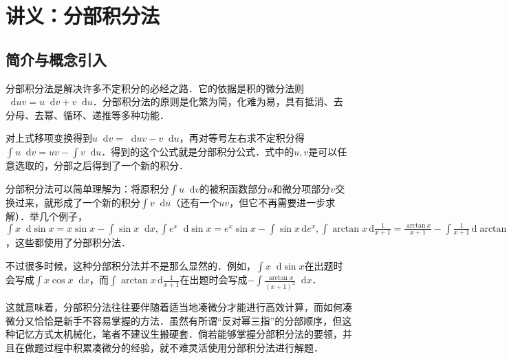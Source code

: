 \documentclass{ctexbook}
\newcommand*{\dif}{\mathop{}\!\mathrm{d}}
\begin{document}
\chapter{讲义：分部积分法}
\section{简介与概念引入}
分部积分法是解决许多不定积分的必经之路．它的依据是积的微分法则$\dif{u}v=u\dif{v}+v\dif{u}$．分部积分法的原则是化繁为简，化难为易，具有抵消、去分母、去幂、循环、递推等多种功能．\par
对上式移项变换得到$u\dif{v}=\dif{u}v-v\dif{u}$，再对等号左右求不定积分得$\int u\dif{v}=uv-\int v\dif{u}$．得到的这个公式就是分部积分公式．式中的$u,v$是可以任意选取的，分部之后得到了一个新的积分．\par
分部积分法可以简单理解为：将原积分$\int u\dif{v}$的被积函数部分$u$和微分项部分$v$交换过来，就形成了一个新的积分$\int v\dif{u}$（还有一个$uv$，但它不再需要进一步求解）．举几个例子，$\int x\dif{\sin{x}}=x\sin{x}-\int\sin{x}\dif{x},\int e^{x}\dif{\sin{x}}=e^{x}\sin{x}-\int\sin{x}\,\mathrm{d}e^{x},\int\arctan{x}\,\mathrm{d}\frac{1}{x+1}=\frac{\arctan{x}}{x+1}-\int\frac{1}{x+1}\,\mathrm{d}\arctan{x}$，这些都使用了分部积分法．\par
不过很多时候，这种分部积分法并不是那么显然的．例如，$\int x\dif{\sin{x}}$在出题时会写成$\int x\cos{x}\dif{x}$，而$\int\arctan{x}\,\mathrm{d}\frac{1}{x+1}$在出题时会写成$-\int\frac{\arctan{x}}{\left(x+1\right)^{2}}\dif{x}$．\par
这就意味着，分部积分法往往要伴随着适当地凑微分才能进行高效计算，而如何凑微分又恰恰是新手不容易掌握的方法．虽然有所谓“反对幂三指”的分部顺序，但这种记忆方式太机械化，笔者不建议生搬硬套．倘若能够掌握分部积分法的要领，并且在做题过程中积累凑微分的经验，就不难灵活使用分部积分法进行解题．\par
\end{document}
